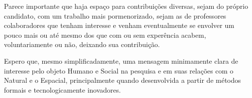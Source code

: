 \documentclass[
	12pt,				%
	openany,			%
	oneside,			%
	a4paper,			%
	english,			%
	french,				%
	spanish,			%
	brazil,				%
	]{abntex2}
\begin{document}
Parece importante que haja espaço para contribuições diversas, sejam do próprio candidato, com um trabalho mais pormenorizado, sejam as de professores colaboradores que tenham interesse e venham eventualmente se envolver um pouco mais ou até mesmo dos que com ou sem experência acabem, voluntariamente ou não, deixando sua contribuição.

Espero que, mesmo simplificadamente, uma mensagem minimamente clara de interesse pelo objeto Humano e Social na pesquisa e em suas relações com o Natural e o Espacial, principalmente quando desenvolvida a partir de métodos formais e tecnologicamente inovadores.


\postextual


\end{document}
